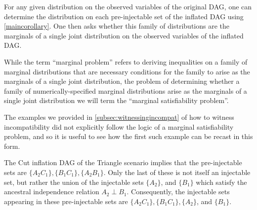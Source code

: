 {For any given distribution on the observed variables of the original DAG, one can determine the distribution on each pre-injectable set of the inflated DAG using \cref{maincorollary}.  One then asks whether this family of distributions are the marginals of a single joint distribution on the observed variables of the inflated DAG.  

While the term ``marginal problem'' refers to deriving inequalities on a family of marginal distributions that are necessary conditions for the family to arise as the marginals of a single joint distribution, the problem of determining whether a family of numerically-specified marginal distributions arise as the marginals of a single joint distribution we will term the ``marginal satisfiability problem''.


The examples we provided in \cref{subsec:witnessingincompat} of how to witness incompatibility did not explicitly follow the logic of a marginal satisfiability problem, and so it is useful to see how the first such example can be recast in this form.  

 
 The Cut inflation DAG  of the Triangle scenario implies that the pre-injectable sets are $\{
A_2 C_1\}, \{B_1 C_1\}, \{ A_2 B_1\}$.  Only the last of these is not itself an injectable set, but rather the union of the injectable sets $\{ A_2\}$, and $\{ B_1\}$ which satisfy the ancestral independence relation $A_2 \perp B_1$.  
Consequently, the injectable sets appearing in these pre-injectable sets are $\{A_2 C_1\}, \{B_1 C_1\}, \{ A_2\}$, and $\{ B_1\}$.

}
